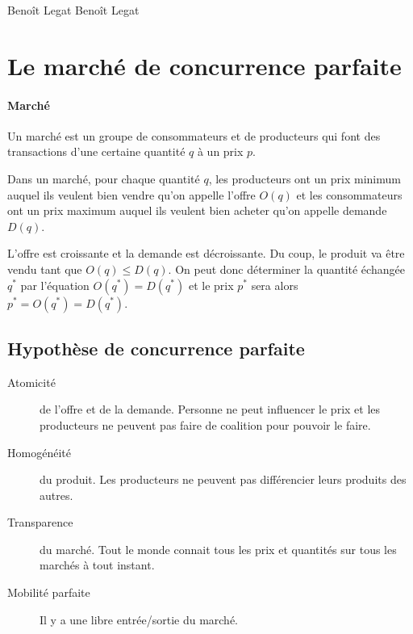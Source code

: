 

{Benoît Legat}
{Benoît Legat}

\newcommand{\elasticity}{\varepsilon}
\newcommand{\pcompt}{\pi}
\newcommand{\ppur}{\pi_{\mathrm{pur}}}
\newcommand{\surplus}{s}
\newcommand{\surpluscons}{{S_c}}
\newcommand{\surplusprod}{S_p}
\newcommand{\surpluscoll}{S}

\newcommand{\Lagr}{\mathcal{L}}

\section{Le marché de concurrence parfaite}
\paragraph{Marché}
Un marché est un groupe de consommateurs et de producteurs
qui font des transactions d'une certaine quantité $q$ à un prix $p$.

Dans un marché, pour chaque quantité $q$, les producteurs ont un prix
minimum auquel ils veulent bien vendre qu'on appelle l'offre $O(q)$
et les consommateurs ont un prix
maximum auquel ils veulent bien acheter qu'on appelle demande $D(q)$.

L'offre est croissante et la demande est décroissante.
Du coup, le produit va être vendu tant que $O(q) \leq D(q)$.
On peut donc déterminer la quantité échangée $q^*$ par l'équation
$O(q^*) = D(q^*)$ et le prix $p^*$ sera alors $p^* = O(q^*) = D(q^*)$.

\subsection{Hypothèse de concurrence parfaite}
\begin{description}
  \item[Atomicité] de l'offre et de la demande.
    Personne ne peut influencer le prix et
    les producteurs ne peuvent pas faire de coalition pour pouvoir le faire.
  \item[Homogénéité] du produit.
    Les producteurs ne peuvent pas différencier leurs produits des autres.
  \item[Transparence] du marché.
    Tout le monde connait tous les prix et quantités sur tous les marchés
    à tout instant.
  \item[Mobilité parfaite]
    Il y a une libre entrée/sortie du marché.
\end{description}

